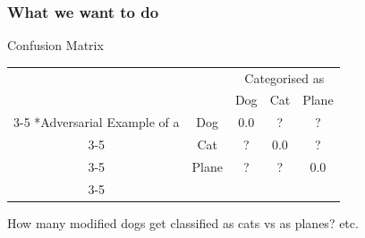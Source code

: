 \documentclass[10pt,usepdftitle=false,aspectratio=169]{beamer}
\begin{document}
\begin{frame}[fragile]
	\frametitle{What we want to do}
	\begin{block}{Confusion Matrix}
		\begin{table}
			\setlength{\extrarowheight}{2pt}
			\begin{tabular}{cc|c|c|c|}
				& \multicolumn{1}{c}{} & \multicolumn{3}{c}{Categorised as}\\
				& \multicolumn{1}{c}{} & \multicolumn{1}{c}{Dog}  & \multicolumn{1}{c}{Cat} & \multicolumn{1}{c}{Plane} \\\cline{3-5}
				\multirow{3}*{Adversarial Example of a}  & Dog & 0.0 & ? & ?\\\cline{3-5}
				& Cat & ? & 0.0 &  ? \\\cline{3-5}
				& Plane & ? & ? &  0.0 \\\cline{3-5}
			\end{tabular}
		\end{table}
		How many modified dogs get classified as cats vs as planes? etc.
	\end{block}
\end{frame}
\end{document}
